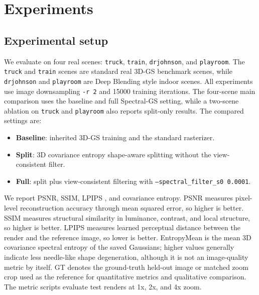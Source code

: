 \documentclass{article}
\begin{document}
\section{Experiments}
\label{sec:experiments}

\subsection{Experimental setup}

We evaluate on four real scenes: \texttt{truck}, \texttt{train}, \texttt{drjohnson}, and \texttt{playroom}. The \texttt{truck} and \texttt{train} scenes are standard real 3D-GS benchmark scenes, while \texttt{drjohnson} and \texttt{playroom} are Deep Blending style indoor scenes. All experiments use image downsampling \texttt{-r 2} and 15000 training iterations. The four-scene main comparison uses the baseline and full Spectral-GS setting, while a two-scene ablation on \texttt{truck} and \texttt{playroom} also reports split-only results. The compared settings are:

\begin{itemize}
    \item \textbf{Baseline}: inherited 3D-GS training and the standard rasterizer.
    \item \textbf{Split}: 3D covariance entropy shape-aware splitting without the view-consistent filter.
    \item \textbf{Full}: split plus view-consistent filtering with \texttt{--spectral\_filter\_s0 0.0001}.
\end{itemize}

We report PSNR, SSIM, LPIPS \cite{zhang2018lpips}, and covariance entropy. PSNR measures pixel-level reconstruction accuracy through mean squared error, so higher is better. SSIM measures structural similarity in luminance, contrast, and local structure, so higher is better. LPIPS measures learned perceptual distance between the render and the reference image, so lower is better. EntropyMean is the mean 3D covariance spectral entropy of the saved Gaussians; higher values generally indicate less needle-like shape degeneration, although it is not an image-quality metric by itself. GT denotes the ground-truth held-out image or matched zoom crop used as the reference for quantitative metrics and qualitative comparison. The metric scripts evaluate test renders at 1x, 2x, and 4x zoom.
\end{document}
